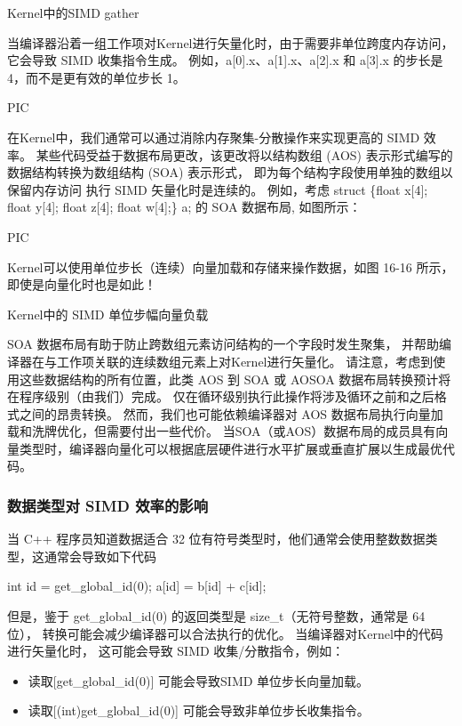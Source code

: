 {\color{red} Kernel中的SIMD gather}

当编译器沿着一组工作项对Kernel进行矢量化时，由于需要非单位跨度内存访问，它会导致 SIMD 收集指令生成。 
例如，a[0].x、a[1].x、a[2].x 和 a[3].x 的步长是 4，而不是更有效的单位步长 1。

{\color{blue} PIC}

在Kernel中，我们通常可以通过消除内存聚集-分散操作来实现更高的 SIMD 效率。 
某些代码受益于数据布局更改，该更改将以结构数组 (AOS) 表示形式编写的数据结构转换为数组结构 (SOA) 表示形式，
即为每个结构字段使用单独的数组以保留内存访问 执行 SIMD 矢量化时是连续的。 
例如，考虑 struct \{float x[4]; float y[4]; float z[4]; float w[4];\} a; 的 SOA 数据布局, 如图所示：

{\color{blue} PIC}

Kernel可以使用单位步长（连续）向量加载和存储来操作数据，如图 16-16 所示，即使是向量化时也是如此！

{\color{red} Kernel中的 SIMD 单位步幅向量负载}

SOA 数据布局有助于防止跨数组元素访问结构的一个字段时发生聚集，
并帮助编译器在与工作项关联的连续数组元素上对Kernel进行矢量化。 
请注意，考虑到使用这些数据结构的所有位置，此类 AOS 到 SOA 或 AOSOA 数据布局转换预计将在程序级别（由我们）完成。 
仅在循环级别执行此操作将涉及循环之前和之后格式之间的昂贵转换。 
然而，我们也可能依赖编译器对 AOS 数据布局执行向量加载和洗牌优化，但需要付出一些代价。 
当SOA（或AOS）数据布局的成员具有向量类型时，编译器向量化可以根据底层硬件进行水平扩展或垂直扩展以生成最优代码。

\subsubsection{数据类型对 SIMD 效率的影响}
当 C++ 程序员知道数据适合 32 位有符号类型时，他们通常会使用整数数据类型，这通常会导致如下代码

int id = get\_global\_id(0); a[id] = b[id] + c[id];

但是，鉴于 get\_global\_id(0) 的返回类型是 size\_t（无符号整数，通常是 64 位），
转换可能会减少编译器可以合法执行的优化。 当编译器对Kernel中的代码进行矢量化时，
这可能会导致 SIMD 收集/分散指令，例如：

\begin{itemize}
	\item 读取[get\_global\_id(0)] 可能会导致SIMD 单位步长向量加载。

	\item 读取[(int)get\_global\_id(0)] 可能会导致非单位步长收集指令。
\end{itemize}

